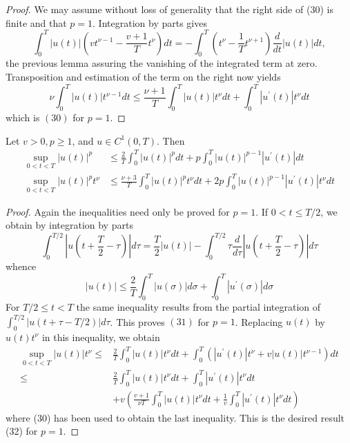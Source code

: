 \begin{proof}
  We may assume without loss of generality that the right side of (30) is finite and that $p=1$. Integration by parts gives
  \[
  \int_0^T|u(t)|\left(v t^{\nu-1}-\frac{v+1}{T} t^\nu\right) d t=-\int_0^T\left(t^\nu-\frac{1}{T} t^{\nu+1}\right) \frac{d}{d t}|u(t)| d t,
  \]
  the previous lemma assuring the vanishing of the integrated term at zero. Transposition and estimation of the term on the right now yields
  \[
  \nu \int_0^T|u(t)| t^{\nu-1} d t \leq \frac{\nu+1}{T} \int_0^T|u(t)| t^\nu d t+\int_0^T\left|u^{\prime}(t)\right| t^\nu d t
  \]
  which is $(30)$ for $p=1$.
\end{proof}


\begin{lemma}
  Let $v>0, p \geq 1$, and $u \in C^1(0, T)$. Then
  \[
  \begin{aligned}
  \sup _{0<t<T}|u(t)|^p & \leq \frac{2}{T} \int_0^T|u(t)|^p d t+p \int_0^T|u(t)|^{p-1}\left|u^{\prime}(t)\right| d t \\
  \sup _{0<t<T}|u(t)|^p t^\nu & \leq \frac{\nu+3}{T} \int_0^T|u(t)|^p t^\nu d t+2 p \int_0^T|u(t)|^{p-1}\left|u^{\prime}(t)\right| t^\nu d t
  \end{aligned}
  \]
\end{lemma}

\begin{proof}
  Again the inequalities need only be proved for $p=1$. If $0<t \leq T / 2$, we obtain by integration by parts
  \[
  \int_0^{T / 2}\left|u\left(t+\frac{T}{2}-\tau\right)\right| d \tau=\frac{T}{2}|u(t)|-\int_0^{T / 2} \tau \frac{d}{d \tau}\left|u\left(t+\frac{T}{2}-\tau\right)\right| d \tau
  \]
  whence
  \[
  |u(t)| \leq \frac{2}{T} \int_0^T|u(\sigma)| d \sigma+\int_0^T\left|u^{\prime}(\sigma)\right| d \sigma
  \]
  For $T / 2 \leq t<T$ the same inequality results from the partial integration of $\int_0^{T / 2}|u(t+\tau-T / 2)| d \tau$. This proves $(31)$ for $p=1$. Replacing $u(t)$ by $u(t) t^\nu$ in this inequality, we obtain
  \[
  \begin{aligned}
  \sup _{0<t<T}|u(t)| t^\nu \leq & \frac{2}{T} \int_0^T|u(t)| t^\nu d t+\int_0^T\left(\left|u^{\prime}(t)\right| t^\nu+v|u(t)| t^{\nu-1}\right) d t \\
  \leq & \frac{2}{T} \int_0^T|u(t)| t^\nu d t+\int_0^T\left|u^{\prime}(t)\right| t^\nu d t \\
  & +v\left(\frac{v+1}{\nu T} \int_0^T|u(t)| t^\nu d t+\frac{1}{v} \int_0^T\left|u^{\prime}(t)\right| t^\nu d t\right)
  \end{aligned}
  \]
  where (30) has been used to obtain the last inequality. This is the desired result (32) for $p=1$.
  
\end{proof}


